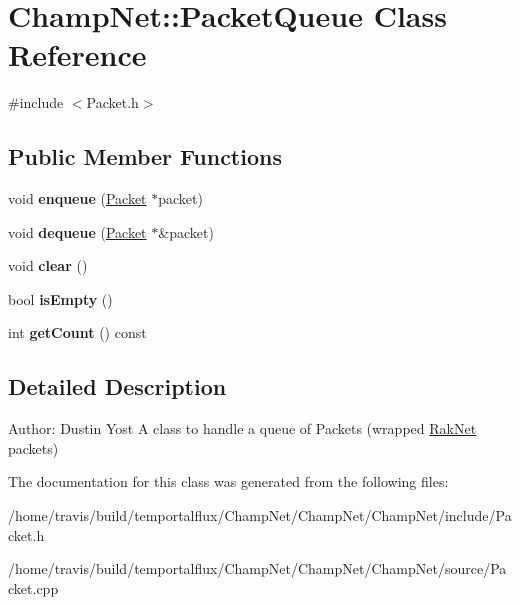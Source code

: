 \hypertarget{class_champ_net_1_1_packet_queue}{\section{Champ\-Net\-:\-:Packet\-Queue Class Reference}
\label{class_champ_net_1_1_packet_queue}
}


{\ttfamily \#include $<$Packet.\-h$>$}

\subsection*{Public Member Functions}
\begin{DoxyCompactItemize}
\item 
\hypertarget{class_champ_net_1_1_packet_queue_ad78fb4bda594d1941de0d0b97cb17c8f}{void {\bfseries enqueue} (\hyperlink{class_champ_net_1_1_packet}{Packet} $\ast$packet)}\label{class_champ_net_1_1_packet_queue_ad78fb4bda594d1941de0d0b97cb17c8f}

\item 
\hypertarget{class_champ_net_1_1_packet_queue_a775c0b091e646b35b24abd60ed8003e9}{void {\bfseries dequeue} (\hyperlink{class_champ_net_1_1_packet}{Packet} $\ast$\&packet)}\label{class_champ_net_1_1_packet_queue_a775c0b091e646b35b24abd60ed8003e9}

\item 
\hypertarget{class_champ_net_1_1_packet_queue_a58fb470b0b4a6678495c36e89a7d4f58}{void {\bfseries clear} ()}\label{class_champ_net_1_1_packet_queue_a58fb470b0b4a6678495c36e89a7d4f58}

\item 
\hypertarget{class_champ_net_1_1_packet_queue_a0959c0f0b04096739dbc64ffb3ce5a00}{bool {\bfseries is\-Empty} ()}\label{class_champ_net_1_1_packet_queue_a0959c0f0b04096739dbc64ffb3ce5a00}

\item 
\hypertarget{class_champ_net_1_1_packet_queue_af160b4a4fe3291c9d4bcb64952b4decb}{int {\bfseries get\-Count} () const }\label{class_champ_net_1_1_packet_queue_af160b4a4fe3291c9d4bcb64952b4decb}

\end{DoxyCompactItemize}


\subsection{Detailed Description}
Author\-: Dustin Yost A class to handle a queue of Packets (wrapped \hyperlink{namespace_rak_net}{Rak\-Net} packets) 

The documentation for this class was generated from the following files\-:\begin{DoxyCompactItemize}
\item 
/home/travis/build/temportalflux/\-Champ\-Net/\-Champ\-Net/\-Champ\-Net/include/Packet.\-h\item 
/home/travis/build/temportalflux/\-Champ\-Net/\-Champ\-Net/\-Champ\-Net/source/Packet.\-cpp\end{DoxyCompactItemize}

